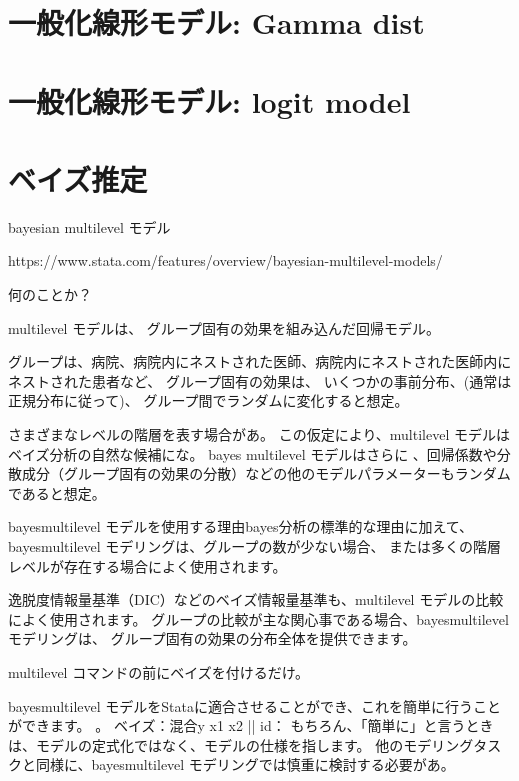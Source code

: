 \documentclass[a4j,11pt,mc, twocolumn]{jreport}
\begin{document}
	\section{一般化線形モデル: Gamma dist}


	\section{一般化線形モデル: logit model}

	\section{ベイズ推定}



	bayesian multilevel モデル

	https://www.stata.com/features/overview/bayesian-multilevel-models/

	何のことか？

	multilevel モデルは、
	グループ固有の効果を組み込んだ回帰モデル。

	グループは、病院、病院内にネストされた医師、病院内にネストされた医師内にネストされた患者など、
	グループ固有の効果は、
	いくつかの事前分布、(通常は正規分布に従って)、
	グループ間でランダムに変化すると想定。


	さまざまなレベルの階層を表す場合があ。
	この仮定により、multilevel モデルはベイズ分析の自然な候補にな。
	bayes multilevel モデルはさらに
	、回帰係数や分散成分（グループ固有の効果の分散）などの他のモデルパラメーターもランダムであると想定。


	bayesmultilevel モデルを使用する理由bayes分析の標準的な理由に加えて、
	bayesmultilevel モデリングは、グループの数が少ない場合、
	または多くの階層レベルが存在する場合によく使用されます。

	逸脱度情報量基準（DIC）などのベイズ情報量基準も、multilevel モデルの比較によく使用されます。
	グループの比較が主な関心事である場合、bayesmultilevel モデリングは、
	グループ固有の効果の分布全体を提供できます。

	multilevel コマンドの前にベイズを付けるだけ。


	bayesmultilevel モデルをStataに適合させることができ、これを簡単に行うことができます。
	。
	ベイズ：混合y x1 x2 || id：
	もちろん、「簡単に」と言うときは、モデルの定式化ではなく、モデルの仕様を指します。
	他のモデリングタスクと同様に、bayesmultilevel モデリングでは慎重に検討する必要があ。
\end{document}
